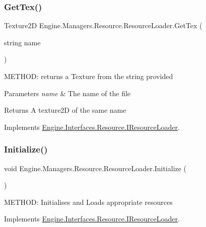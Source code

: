 \subsubsection{\texorpdfstring{Get\+Tex()}{GetTex()}}
{\footnotesize\ttfamily Texture2D Engine.\+Managers.\+Resource.\+Resource\+Loader.\+Get\+Tex (\begin{DoxyParamCaption}\item[{string}]{name }\end{DoxyParamCaption})\hspace{0.3cm}{\ttfamily [inline]}}



M\+E\+T\+H\+OD\+: returns a Texture from the string provided 


\begin{DoxyParams}{Parameters}
{\em name} & The name of the file\\
\hline
\end{DoxyParams}
\begin{DoxyReturn}{Returns}
A texture2D of the same name
\end{DoxyReturn}


Implements \hyperlink{a00462_ad126b831364ad6219c3f25729c591597}{Engine.\+Interfaces.\+Resource.\+I\+Resource\+Loader}.

\mbox{\label{a00530_a77b00bda1dc37c9cabe2dbaf90655714}} 
\subsubsection{\texorpdfstring{Initialize()}{Initialize()}}
{\footnotesize\ttfamily void Engine.\+Managers.\+Resource.\+Resource\+Loader.\+Initialize (\begin{DoxyParamCaption}{ }\end{DoxyParamCaption})\hspace{0.3cm}{\ttfamily [inline]}}



M\+E\+T\+H\+OD\+: Initialises and Loads appropriate resources 



Implements \hyperlink{a00462_ad861af436f861ea7d9c0966edfadac82}{Engine.\+Interfaces.\+Resource.\+I\+Resource\+Loader}.

